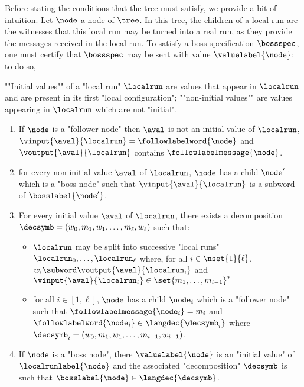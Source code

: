 Before stating the conditions that the tree must satisfy, we provide a bit of intuition. Let $\node$ a node of $\tree$. In this tree, the children of a local run are the witnesses that this local run may be turned into a real run, as they provide the messages received in the local run. To satisfy a boss specification $\bossspec$, one must certify that $\bossspec$ may be sent with value $\valuelabel{\node}$; to do so, 

""Initial values"" of a "local run" $\localrun$ are values that appear in $\localrun$ and are present in its first "local configuration"; ""non-initial values"" are values appearing in $\localrun$ which are not "initial".

\begin{enumerate}
	\item \label{item:follower_node} If $\node$ is a "follower node" then $\aval$ is not an initial value of $\localrun$, $\vinput{\aval}{\localrun} = \followlabelword{\node}$ and 
	$\voutput{\aval}{\localrun}$ contains $\followlabelmessage{\node}$.
	\item \label{item:non_initial_value} for every non-initial value $\aval$ of $\localrun$, $\node$ has a child $\node'$ which is a "boss node" such that $\vinput{\aval}{\localrun}$ is a subword of $\bosslabel{\node'}$.
	\item \label{item: initial_value} For every initial value $\aval$ of $\localrun$, there exists a decomposition $\decsymb = (w_0, m_1, w_1, \ldots, m_{\ell}, w_{\ell})$ such that:
	\begin{itemize}
		\item $\localrun$ may be split into successive "local runs" $\localrun_0, \dots, \localrun_{\ell}$ where, for all $i \in \nset{1}{\ell}$, $w_i \subword \voutput{\aval}{\localrun_i}$ and $\vinput{\aval}{\localrun_i} \in \set{m_1, \dots, m_{i-1}}^*$
		\item for all $i \in [1,\ell]$, $\node$ has a child $\node_i$ which is a "follower node" such that $\followlabelmessage{\node_i} = m_i$ and $\followlabelword{\node_i} \in\langdec{\decsymb_i}$ where $\decsymb_i = (w_0, m_1, w_1, \ldots, m_{i-1}, w_{i-1})$.
	\end{itemize}
	\item \label{item:boss_node} If $\node$ is a "boss node", there $\valuelabel{\node}$ is an "initial value" of $\localrunlabel{\node}$ and the associated "decomposition" $\decsymb$ is such that $\bosslabel{\node} \in \langdec{\decsymb}$.
\end{enumerate}


